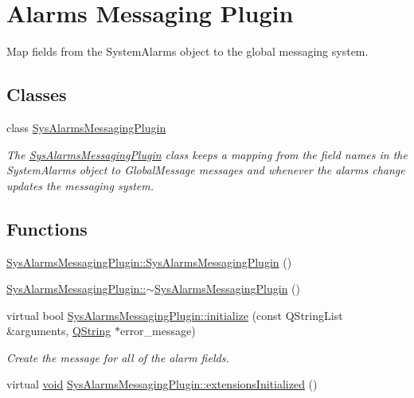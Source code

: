 \hypertarget{group___system}{\section{\-Alarms \-Messaging \-Plugin}
\label{group___system}
}


\-Map fields from the \-System\-Alarms object to the global messaging system.  


\subsection*{\-Classes}
\begin{DoxyCompactItemize}
\item 
class \hyperlink{class_sys_alarms_messaging_plugin}{\-Sys\-Alarms\-Messaging\-Plugin}
\begin{DoxyCompactList}\small\item\em \-The \hyperlink{class_sys_alarms_messaging_plugin}{\-Sys\-Alarms\-Messaging\-Plugin} class keeps a mapping from the field names in the \-System\-Alarms object to \-Global\-Message messages and whenever the alarms change updates the messaging system. \end{DoxyCompactList}\end{DoxyCompactItemize}
\subsection*{\-Functions}
\begin{DoxyCompactItemize}
\item 
\hyperlink{group___system_ga28d933c66393f5dcb0a9f5be71c29476}{\-Sys\-Alarms\-Messaging\-Plugin\-::\-Sys\-Alarms\-Messaging\-Plugin} ()
\item 
\hyperlink{group___system_gadb9f2fd8f551a876369ad14edccafb77}{\-Sys\-Alarms\-Messaging\-Plugin\-::$\sim$\-Sys\-Alarms\-Messaging\-Plugin} ()
\item 
virtual bool \hyperlink{group___system_gaee946a3db8f69ee44247462593349d71}{\-Sys\-Alarms\-Messaging\-Plugin\-::initialize} (const \-Q\-String\-List \&arguments, \hyperlink{group___u_a_v_objects_plugin_gab9d252f49c333c94a72f97ce3105a32d}{\-Q\-String} $\ast$error\-\_\-message)
\begin{DoxyCompactList}\small\item\em \-Create the message for all of the alarm fields. \end{DoxyCompactList}\item 
virtual \hyperlink{group___u_a_v_objects_plugin_ga444cf2ff3f0ecbe028adce838d373f5c}{void} \hyperlink{group___system_gafbeee237df9ed93b1f831cf2f8770055}{\-Sys\-Alarms\-Messaging\-Plugin\-::extensions\-Initialized} ()
\end{DoxyCompactItemize}



